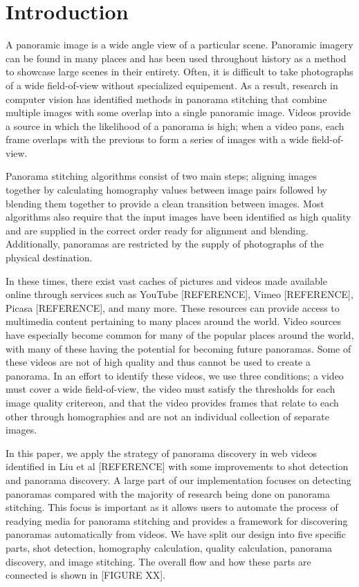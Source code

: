 \section{Introduction}
A panoramic image is a wide angle view of a particular scene. Panoramic imagery can be found in many places 
and has been used throughout history as a method to showcase large scenes in their entirety. Often, it is 
difficult to take photographs of a wide field-of-view without specialized equipement. As a result, research
in computer vision has identified methods in panorama stitching that combine multiple images with some 
overlap into a single panoramic image. Videos provide a source in which the likelihood of a panorama is high;
when a video pans, each frame overlaps with the previous to form a series of images with a wide field-of-view.
\par
Panorama stitching algorithms consist of two main steps; aligning images together by calculating homography
values between image pairs followed by blending them together to provide a clean transition between images.
Most algorithms also require that the input images have been identified as high quality and are supplied in 
the correct order ready for alignment and blending. Additionally, panoramas are restricted by the supply of
photographs of the physical destination. 
\par 
In these times, there exist vast caches of pictures and videos made available online through services such as
YouTube [REFERENCE], Vimeo [REFERENCE], Picasa [REFERENCE], and many more. These resources can provide access
to multimedia content pertaining to many places around the world. Video sources have especially become common
for many of the popular places around the world, with many of these having the potential for becoming future
panoramas. Some of these videos are not of high quality and thus cannot be used to create a panorama. In an 
effort to identify these videos, we use three conditions; a video must cover a wide field-of-view, the video
must satisfy the thresholds for each image quality critereon, and that the video provides frames that relate
to each other through homographies and are not an individual collection of separate images.
\par
In this paper, we apply the strategy of panorama discovery in web videos identified in Liu et al [REFERENCE] 
with some improvements to shot detection and panorama discovery. A large part of our implementation focuses
on detecting panoramas compared with the majority of research being done on panorama stitching. This focus
is important as it allows users to automate the process of readying media for panorama stitching and provides
a framework for discovering panoramas automatically from videos. We have split our design into five specific 
parts, shot detection, homography calculation, quality calculation, panorama discovery, and image stitching. 
The overall flow and how these parts are connected is shown in [FIGURE XX].